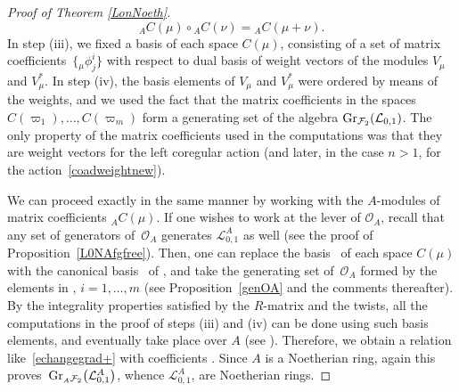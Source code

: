 \documentclass[10pt,a4paper]{amsart}
\numberwithin{equation}{section}
\theoremstyle{definition}
\newcommand{\Ll}{{\mathcal L}}
\newcommand{\Oo}{{\mathcal O}}
\newcommand{\smallbullet}{%
\vcenter{\hbox{\,\scalebox{0.5}{$\bullet$}\,}}
}
\begin{document}
\begin{proof}[Proof of Theorem \ref{LonNoeth}]
\[%
{}_AC(\mu) \circ{}_AC(\nu) = {}_AC(\mu + \nu).
\]
In step (iii), we fixed a basis of each space $C(\mu)$, consisting of a set of matrix coefficients~$\big\{{}_\mu\phi^i_j\big\}$ with respect to dual basis of weight vectors of the modules $V_\mu$ and $V_\mu^*$. In step (iv), the basis elements of $V_\mu$ and $V_\mu^*$ were ordered by means of the weights, and we used the fact that the matrix coefficients in the spaces $C(\varpi_1),\dots,C(\varpi_m)$ form a generating set of the algebra $ {\rm Gr}_{\mathcal{F}_2}({\mathcal L}_{0,1})$. The only property of the matrix coefficients used in the computations was that they are weight vectors for the left coregular action (and later, in the case $n>1$, for the action~\eqref{coadweightnew}).

We can proceed exactly in the same manner by working with the $A$-modules of matrix coefficients ${}_AC(\mu)$. If one wishes to work at the lever of $\Oo_A$, recall that any set of generators of~$\Oo_A$ generates $\Ll_{0,1}^A$ as well (see the proof of Proposition~\ref{L0NAfgfree}). Then, one can replace the basis~ of each space $C(\mu)$ with the canonical basis~ of \smash{${}_A \overset{\raisebox{-1.5pt}{\scriptsize$\smallbullet$}}{C} (\mu)$}, and take the generating set of~$\Oo_A$ formed by the elements in , $i=1,\dots,m$ (see Proposition~\ref{genOA} and the comments thereafter). By the integrality properties satisfied by the $R$-matrix and the twists, all the computations in the proof of steps (iii) and (iv) can be done using such basis elements, and eventually take place over $A$ (see \cite[Propositions 4.10 and 6.9]{BR}). Therefore, we obtain a relation like~\eqref{echangegrad+} with coefficients . Since $A$ is a Noetherian ring, again this proves~${ {\rm Gr}_{ {}_A\mathcal{F}_2}\big({\mathcal L}_{0,1}^A\big)}$, whence ${\mathcal L}_{0,1}^A$, are Noetherian rings.


\end{proof}
\end{document}
